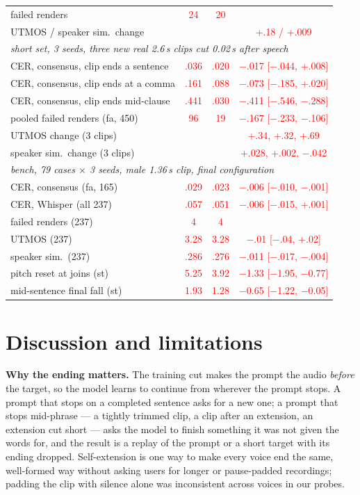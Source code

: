 \documentclass[conference]{IEEEtran}
\newcommand{\RES}[1]{\textcolor{red}{#1}}
\begin{document}
\begin{table}[t]
\begin{tabular}{lccc}
failed renders & \RES{24} & \RES{20} & \\
UTMOS / speaker sim.\ change & & & \RES{+.18 / +.009} \\
\midrule
\multicolumn{4}{l}{\emph{short set, 3 seeds, three new real 2.6\,s clips cut 0.02\,s after speech}} \\
CER, consensus, clip ends a sentence & \RES{.036} & \RES{.020} & \RES{$-$.017 [$-$.044, +.008]} \\
CER, consensus, clip ends at a comma & \RES{.161} & \RES{.088} & \RES{$-$.073 [$-$.185, +.020]} \\
CER, consensus, clip ends mid-clause & \RES{.441} & \RES{.030} & \RES{$-$.411 [$-$.546, $-$.288]} \\
pooled failed renders (fa, 450) & \RES{96} & \RES{19} & \RES{$-$.167 [$-$.233, $-$.106]} \\
UTMOS change (3 clips) & & & \RES{+.34, +.32, +.69} \\
speaker sim.\ change (3 clips) & & & \RES{+.028, +.002, $-$.042} \\
\midrule
\multicolumn{4}{l}{\emph{bench, 79 cases $\times$ 3 seeds, male 1.36\,s clip, final configuration}} \\
CER, consensus (fa, 165) & \RES{.029} & \RES{.023} & \RES{$-$.006 [$-$.010, $-$.001]} \\
CER, Whisper (all 237) & \RES{.057} & \RES{.051} & \RES{$-$.006 [$-$.015, +.001]} \\
failed renders (237) & \RES{4} & \RES{4} & \\
UTMOS (237) & \RES{3.28} & \RES{3.28} & \RES{$-$.01 [$-$.04, +.02]} \\
speaker sim.\ (237) & \RES{.286} & \RES{.276} & \RES{$-$.011 [$-$.017, $-$.004]} \\
pitch reset at joins (st) & \RES{5.25} & \RES{3.92} & \RES{$-$1.33 [$-$1.95, $-$0.77]} \\
mid-sentence final fall (st) & \RES{1.93} & \RES{1.28} & \RES{$-$0.65 [$-$1.22, $-$0.05]} \\
\bottomrule
\end{tabular}
\end{table}

\section{Discussion and limitations}
\textbf{Why the ending matters.} The training cut makes the prompt the audio \emph{before} the target, so
the model learns to continue from wherever the prompt stops. A prompt that stops on a completed sentence
asks for a new one; a prompt that stops mid-phrase --- a tightly trimmed clip, a clip after an extension, an
extension cut short --- asks the model to finish something it was not given the words for, and the result
is a replay of the prompt or a short target with its ending dropped. Self-extension is one way to make every
voice end the same, well-formed way without asking users for longer or pause-padded recordings; padding the
clip with silence alone was inconsistent across voices in our probes.
\end{document}
